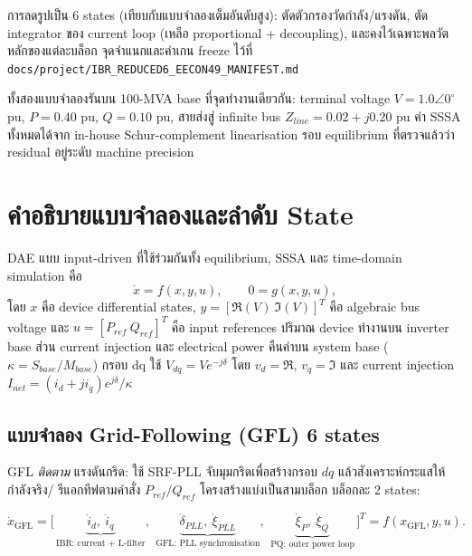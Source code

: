 \documentclass[12pt,a4paper]{article}
\begin{document}
การลดรูปเป็น 6 states (เทียบกับแบบจำลองเต็มอันดับสูง): ตัดตัวกรองวัดกำลัง/แรงดัน, ตัด integrator ของ
current loop (เหลือ proportional + decoupling), และคงไว้เฉพาะพลวัตหลักของแต่ละบล็อก จุดจำแนกและค่าเกน
freeze ไว้ที่ \texttt{docs/project/IBR\_REDUCED6\_EECON49\_MANIFEST.md}

ทั้งสองแบบจำลองรันบน 100-MVA base ที่จุดทำงานเดียวกัน: terminal voltage $V=1.0\angle0^\circ$ pu,
$P=0.40$ pu, $Q=0.10$ pu, สายส่งสู่ infinite bus $Z_{line}=0.02+j0.20$ pu ค่า SSSA ทั้งหมดได้จาก
in-house Schur-complement linearisation รอบ equilibrium ที่ตรวจแล้วว่า residual อยู่ระดับ machine precision

\section{คำอธิบายแบบจำลองและลำดับ State}

DAE แบบ input-driven ที่ใช้ร่วมกันทั้ง equilibrium, SSSA และ time-domain simulation คือ
\begin{equation}
\dot x = f(x,y,u),\qquad 0 = g(x,y,u),
\label{eq:dae}
\end{equation}
โดย $x$ คือ device differential states, $y=[\Re(V)\ \Im(V)]^T$ คือ algebraic bus voltage และ
$u=[P_{ref}\ Q_{ref}]^T$ คือ input references ปริมาณ device ทำงานบน inverter base ส่วน current injection
และ electrical power คืนค่าบน system base ($\kappa=S_{base}/M_{base}$) กรอบ dq ใช้
$V_{dq}=Ve^{-j\delta}$ โดย $v_d=\Re$, $v_q=\Im$ และ current injection
$I_{net}=(i_d+ji_q)e^{j\delta}/\kappa$

\subsection{แบบจำลอง Grid-Following (GFL) 6 states}
\label{subsec:gfl}

GFL \emph{ติดตาม} แรงดันกริด: ใช้ SRF-PLL จับมุมกริดเพื่อสร้างกรอบ $dq$ แล้วสังเคราะห์กระแสให้กำลังจริง/
รีแอกทีฟตามคำสั่ง $P_{ref}/Q_{ref}$ โครงสร้างแบ่งเป็นสามบล็อก บล็อกละ 2 states:

\begin{equation}
\dot x_{\text{GFL}} =\Big[\,
\underbrace{\dot i_d,\ \dot i_q}_{\text{IBR: current + L-filter}},\ \,
\underbrace{\dot\delta_{PLL},\ \dot\xi_{PLL}}_{\text{GFL: PLL synchronisation}},\ \,
\underbrace{\dot\xi_{P},\ \dot\xi_{Q}}_{\text{PQ: outer power loop}}
\,\Big]^{T}= f(x_{\text{GFL}},y,u).
\label{eq:gfl-order}
\end{equation}
\end{document}
